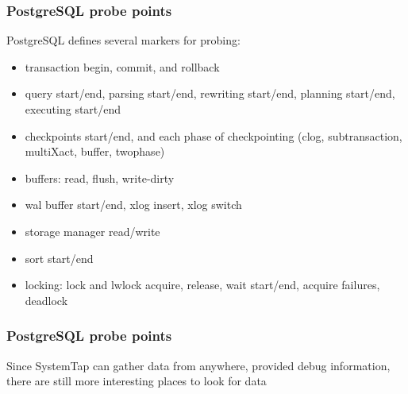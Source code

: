 \documentclass{beamer}
\begin{document}
\begin{frame}
     \frametitle{PostgreSQL probe points}
     PostgreSQL defines several markers for probing:
     \begin{itemize}
         \item transaction begin, commit, and rollback
         \item query start/end, parsing start/end, rewriting start/end, planning start/end, executing start/end
         \item checkpoints start/end, and each phase of checkpointing (clog, subtransaction, multiXact, buffer, twophase)
         \item buffers: read, flush, write-dirty
         \item wal buffer start/end, xlog insert, xlog switch
         \item storage manager read/write
         \item sort start/end
         \item locking: lock and lwlock acquire, release, wait start/end, acquire failures, deadlock
     \end{itemize}
\end{frame}

\begin{frame}
     \frametitle{PostgreSQL probe points}
     Since SystemTap can gather data from anywhere, provided debug information, there are still more interesting places to look for data
\end{frame}
\end{document}
